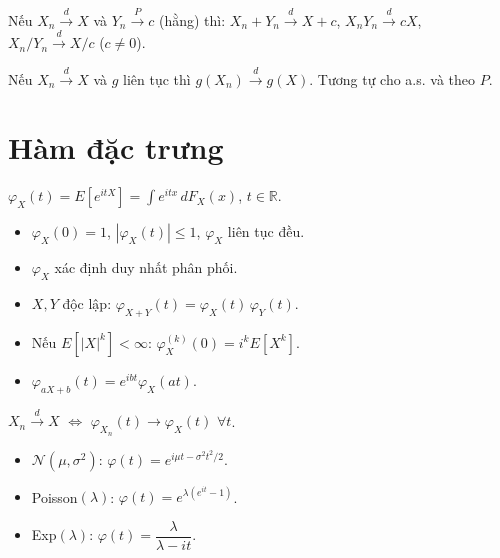 \documentclass[12pt,a4paper]{article}
\begin{document}
\begin{dinhly}[title={Định lý Slutsky}]
  Nếu $X_n \xrightarrow{d} X$ và $Y_n \xrightarrow{P} c$ (hằng) thì:
  $X_n + Y_n \xrightarrow{d} X + c$, \;$X_n Y_n \xrightarrow{d} cX$, \;$X_n/Y_n \xrightarrow{d} X/c$ ($c \ne 0$).
\end{dinhly}

\begin{dinhly}[title={Định lý ánh xạ liên tục (Continuous Mapping)}]
  Nếu $X_n \xrightarrow{d} X$ và $g$ liên tục thì $g(X_n) \xrightarrow{d} g(X)$. Tương tự cho a.s. và theo $P$.
\end{dinhly}

\section{Hàm đặc trưng}

\begin{dinhnghia}
  $\varphi_X(t) = E[e^{itX}] = \displaystyle\int e^{itx}\,dF_X(x)$, $t \in \mathbb{R}$.
\end{dinhnghia}

\begin{tinhchat}
  \begin{itemize}
    \item $\varphi_X(0) = 1$, $|\varphi_X(t)| \le 1$, $\varphi_X$ liên tục đều.
    \item $\varphi_X$ xác định duy nhất phân phối.
    \item $X, Y$ độc lập: $\varphi_{X+Y}(t) = \varphi_X(t)\,\varphi_Y(t)$.
    \item Nếu $E[|X|^k] < \infty$: $\varphi_X^{(k)}(0) = i^k E[X^k]$.
    \item $\varphi_{aX+b}(t) = e^{ibt}\varphi_X(at)$.
  \end{itemize}
\end{tinhchat}

\begin{dinhly}[title={Định lý liên tục Lévy}]
  $X_n \xrightarrow{d} X$ $\Leftrightarrow$ $\varphi_{X_n}(t) \to \varphi_X(t)$ $\forall t$.
\end{dinhly}

\begin{vidu}
  \begin{itemize}
    \item $\mathcal{N}(\mu, \sigma^2)$: $\varphi(t) = e^{i\mu t - \sigma^2 t^2/2}$.
    \item Poisson$(\lambda)$: $\varphi(t) = e^{\lambda(e^{it}-1)}$.
    \item Exp$(\lambda)$: $\varphi(t) = \dfrac{\lambda}{\lambda - it}$.
  \end{itemize}
\end{vidu}
\end{document}
